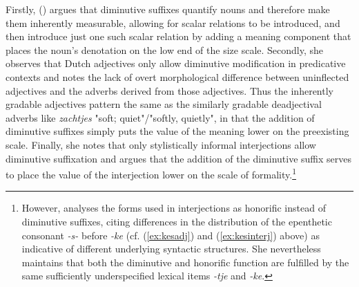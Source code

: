 Firstly, \citeauthor{DeBelder+2022} (\citeyear{DeBelder+2022}) argues that diminutive suffixes quantify nouns and therefore make them inherently measurable, allowing for scalar relations to be introduced, and then introduce just one such scalar relation by adding a meaning component that places the noun's denotation on the low end of the size scale. Secondly, she observes that Dutch adjectives only allow diminutive modification in predicative contexts and notes the lack of overt morphological difference between uninflected adjectives and the adverbs derived from those adjectives. Thus the inherently gradable adjectives pattern the same as the similarly gradable deadjectival adverbs like \textit{zachtjes} "soft; quiet"/"softly, quietly", in that the addition of diminutive suffixes simply puts the value of the meaning lower on the preexisting scale. Finally, she notes that only stylistically informal interjections allow diminutive suffixation and argues that the addition of the diminutive suffix serves to place the value of the interjection lower on the scale of formality.\footnote{However, \citeauthor{DeBelder+2022} analyses the forms used in interjections as honorific instead of diminutive suffixes, citing differences in the distribution of the epenthetic consonant \textit{-s-} before \textit{-ke} (cf. (\ref{ex:kesadj}) and (\ref{ex:kesinterj}) above) as indicative of different underlying syntactic structures. She nevertheless maintains that both the diminutive and honorific function are fulfilled by the same sufficiently underspecified lexical items \textit{-tje} and \textit{-ke}.} 

